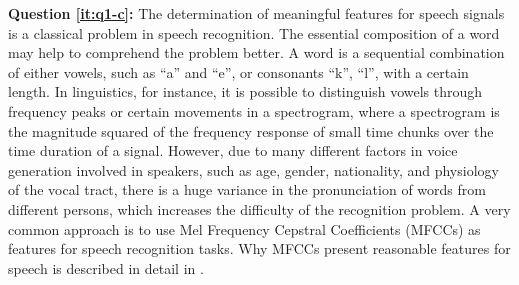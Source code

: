\textbf{Question \ref{it:q1-c}:} 
The determination of meaningful features for speech signals is a classical problem in speech recognition.
The essential composition of a word may help to comprehend the problem better.
A word is a sequential combination of either vowels, such as \enquote{a} and \enquote{e}, or consonants \enquote{k}, \enquote{l}, with a certain length. 
In linguistics, for instance, it is possible to distinguish vowels through frequency peaks or certain movements in a spectrogram, where a spectrogram is the magnitude squared of the frequency response of small time chunks over the time duration of a signal.
However, due to many different factors in voice generation involved in speakers, such as age, gender, nationality, and physiology of the vocal tract, there is a huge variance in the pronunciation of words from different persons, which increases the difficulty of the recognition problem.
A very common approach is to use Mel Frequency Cepstral Coefficients (MFCCs) as features for speech recognition tasks.
Why MFCCs present reasonable features for speech is described in detail in .



